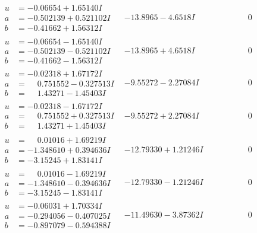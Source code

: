 \documentclass[1p]{elsarticle_modified}
\theoremstyle{definition}
\begin{document}
$$\begin{array}{c|c|c}
\begin{aligned}
u &= -0.06654 + 1.65140 I \\
a &= -0.502139 + 0.521102 I \\
b &= -0.41662 + 1.56312 I\end{aligned}
 & -13.8965 - 4.6518 I & \phantom{-0.000000 } 0 \\ \hline\begin{aligned}
u &= -0.06654 - 1.65140 I \\
a &= -0.502139 - 0.521102 I \\
b &= -0.41662 - 1.56312 I\end{aligned}
 & -13.8965 + 4.6518 I & \phantom{-0.000000 } 0 \\ \hline\begin{aligned}
u &= -0.02318 + 1.67172 I \\
a &= \phantom{-}0.751552 - 0.327513 I \\
b &= \phantom{-}1.43271 - 1.45403 I\end{aligned}
 & -9.55272 - 2.27084 I & \phantom{-0.000000 } 0 \\ \hline\begin{aligned}
u &= -0.02318 - 1.67172 I \\
a &= \phantom{-}0.751552 + 0.327513 I \\
b &= \phantom{-}1.43271 + 1.45403 I\end{aligned}
 & -9.55272 + 2.27084 I & \phantom{-0.000000 } 0 \\ \hline\begin{aligned}
u &= \phantom{-}0.01016 + 1.69219 I \\
a &= -1.348610 + 0.394636 I \\
b &= -3.15245 + 1.83141 I\end{aligned}
 & -12.79330 + 1.21246 I & \phantom{-0.000000 } 0 \\ \hline\begin{aligned}
u &= \phantom{-}0.01016 - 1.69219 I \\
a &= -1.348610 - 0.394636 I \\
b &= -3.15245 - 1.83141 I\end{aligned}
 & -12.79330 - 1.21246 I & \phantom{-0.000000 } 0 \\ \hline\begin{aligned}
u &= -0.06031 + 1.70334 I \\
a &= -0.294056 - 0.407025 I \\
b &= -0.897079 - 0.594388 I\end{aligned}
 & -11.49630 - 3.87362 I & \phantom{-0.000000 } 0 \\ \hline\begin{aligned}

\end{aligned}
\end{array}$$
\end{document}
